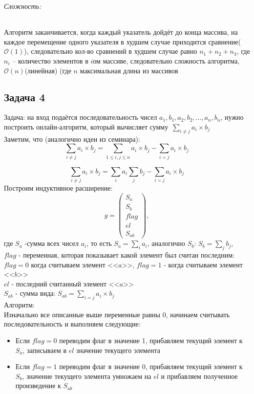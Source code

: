 \documentclass[a4paper,12pt]{article} %
\begin{document}
\begin{large}
\textit{Сложность:}
\end{large}\\
Алгоритм заканчивается, когда каждый указатель дойдёт до конца массива, на каждое перемещение одного указателя в худшем случае приходится сравнение($\mathcal{O}(1)$), следовательно кол-во сравнений в худшем случае равно $ n_1 + n_2 +n_3 $, где $ n_i $ -- количество элементов в $ i $ом массиве, следовательно сложность алгоритма, $\mathcal{O}(n)$(линейная) (где $ n $ максимальная длина из массивов

\subsection*{Задача 4}
Задача: на вход подаётся последовательность чисел $a_1, b_1, a_2, b_2, \ldots, a_n, b_n$, нужно построить онлайн-алгоритм, который вычисляет сумму~$\sum\limits_{ i\neq j} a_i\times b_j$\\
Заметим, что (аналогично идеи из семинара):
$$\sum\limits_{i\neq j} a_i\times b_j = \sum\limits_{ 1 \leq i, j \leq n} a_i\times b_j - \sum\limits_{i = j} a_i\times b_j$$

\begin{equation}\label{otvet}
\sum\limits_{i\neq j} a_i\times b_j = \sum\limits_{i} a_i \sum\limits_{j} b_j - \sum\limits_{ i = j} a_i\times b_j
\end{equation}
Построим индуктивное расширение:
$$g = \left(\begin{array}{c}{S_a} \\ {S_b} \\ {flag}\\ el \\ S_{ab}\end{array}\right),$$
где $ S_a $ -сумма всех чисел $ a_i $,  то есть $S_a = \sum\limits_{i} a_i$, аналогично $ S_b $: $S_b = \sum\limits_{j} b_j$,\\
$ flag $ - переменная, которая показывает какой элемент был считан последним: $flag = 0$ когда считываем элемент <<$a$>>, $flag = 1$ - когда считываем элемент <<$b$>>\\
$el$ - последний считанный элемент <<$a$>>\\
$S_{ab}$ - сумма вида: $S_{ab} = \sum\limits_{ i = j} a_i\times b_j$\\
Алгоритм:\\
Изначально все описанные выше переменные равны 0, начинаем считывать последовательность и выполняем следующие:
\begin{itemize}
\item  Если $flag = 0$ переводим флаг в значение 1, прибавляем текущий элемент к $S_a$, записываем в $el$ значение текущего элемента
\item Если $flag = 1$ переводим флаг в значение 0, прибавляем текущий элемент к $S_b$, значение текущего элемента умножаем на $el$ и прибавляем полученное произведение к $S_{ab}$
\end{itemize}
\end{document}
